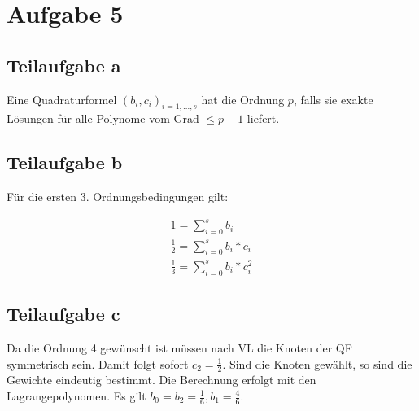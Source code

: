 \section*{Aufgabe 5}
\subsection*{Teilaufgabe a}
Eine Quadraturformel $(b_i, c_i)_{i=1, \dots, s}$ hat die Ordnung
$p$, falls sie exakte Lösungen für alle Polynome vom Grad $\leq p -1$
liefert.

\subsection*{Teilaufgabe b}
Für die ersten 3. Ordnungsbedingungen gilt:

\begin{align*}
	1 = \sum_{i = 0}^{s} b_i \\
 	\frac{1}{2} = \sum_{i = 0}^{s} b_i * c_i \\
 	\frac{1}{3} = \sum_{i = 0}^{s} b_i * c_i^2
\end{align*}

\subsection*{Teilaufgabe c}
Da die Ordnung 4 gewünscht ist müssen nach VL die Knoten der QF symmetrisch sein. Damit folgt sofort $c_2 = \frac{1}{2}$. Sind die Knoten gewählt, so sind die Gewichte eindeutig bestimmt. Die Berechnung erfolgt mit den Lagrangepolynomen. Es gilt $b_0 = b_2 = \frac{1}{6}, b_1 = \frac{4}{6}$.